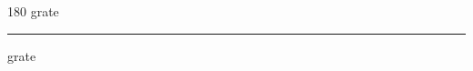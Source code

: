 
\begin{frame}
\begin{center}
\begin{turn}{180}
{\fontsize{2.5cm}{1em}\selectfont grate}
\end{turn}
\vspace{1em}\par  
\hrule
\vspace{1em}\par  
{\fontsize{2.5cm}{1em}\selectfont grate}
\end{center}
\end{frame}
